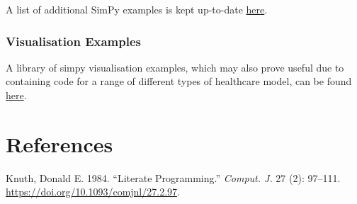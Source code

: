 \documentclass[
  letterpaper,
  DIV=11,
  numbers=noendperiod]{scrreprt}
\newlength{\cslhangindent}
\newenvironment{CSLReferences}[2] %
 {\begin{list}{}{%
  \setlength{\itemindent}{0pt}
  \setlength{\leftmargin}{0pt}
  \setlength{\parsep}{0pt}
  \ifodd #1
   \setlength{\leftmargin}{\cslhangindent}
   \setlength{\itemindent}{-1\cslhangindent}
  \fi
  \setlength{\itemsep}{#2\baselineskip}}}
 {\end{list}}
\begin{document}
A list of additional SimPy examples is kept up-to-date
\href{https://github.com/stars/Bergam0t/lists/simpy-examples}{here}.

\subsection{Visualisation Examples}\label{visualisation-examples}

A library of simpy visualisation examples, which may also prove useful
due to containing code for a range of different types of healthcare
model, can be found
\href{https://github.com/Bergam0t/simpy_visualisation}{here}.


\chapter*{References}\label{references}


\label{refs}
\begin{CSLReferences}{1}{0}
Knuth, Donald E. 1984. {``Literate Programming.''} \emph{Comput. J.} 27
(2): 97--111. \url{https://doi.org/10.1093/comjnl/27.2.97}.

\end{CSLReferences}
\end{document}
